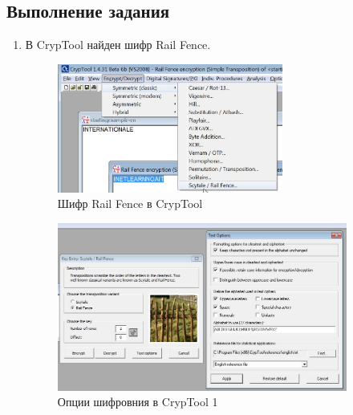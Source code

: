 \documentclass[a4paper, 14pt]{extarticle}
\begin{document}
\subsection{Выполнение задания}
\begin{enumerate}
    \item В CrypTool найден шифр Rail Fence. 
    \begin{figure}[h]
        \centering
        \includegraphics[width=0.7\textwidth]{./img/S002.jpg}
        \caption{Шифр Rail Fence в CrypTool}%
        \label{img:fence:1}
    \end{figure}
    \begin{figure}[h]
        \centering
        \includegraphics[width=0.9\textwidth]{./img/S005.jpg}
        \caption{Опции шифровния в CrypTool 1}%
        \label{img:fence:2}
    \end{figure}


\end{enumerate}
\end{document}
